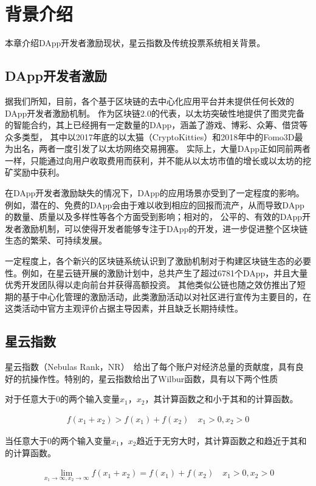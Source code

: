 \section{背景介绍}
本章介绍DApp开发者激励现状，星云指数及传统投票系统相关背景。

\subsection{DApp开发者激励}
据我们所知，目前，各个基于区块链的去中心化应用平台并未提供任何长效的DApp开发者激励机制。
作为区块链2.0的代表，以太坊突破性地提供了图灵完备的智能合约，其上已经拥有一定数量的DApp，涵盖了游戏、博彩、众筹、借贷等众多类型，
其中以2017年底的以太猫（CryptoKitties）和2018年中的Fomo3D\cite{Fomo3D}最为出名，两者一度引发了以太坊网络交易拥塞。
实际上，大量DApp正如同前两者一样，只能通过向用户收取费用而获利，并不能从以太坊市值的增长或以太坊的挖矿奖励中获利。

在DApp开发者激励缺失的情况下，DApp的应用场景亦受到了一定程度的影响。例如，潜在的、免费的DApp会由于难以收到相应的回报而流产，从而导致DApp的数量、质量以及多样性等各个方面受到影响；相对的，
公平的、有效的DApp开发者激励机制，可以使得开发者能够专注于DApp的开发，进一步促进整个区块链生态的繁荣、可持续发展。

一定程度上，各个新兴的区块链系统认识到了激励机制对于构建区块链生态的必要性。例如，在星云链开展的激励计划中，总共产生了超过6781个DApp，并且大量优秀开发团队得以走向前台并获得高额投资\cite{Nabulasincentive}。
其他类似公链也随之效仿推出了短期的基于中心化管理的激励活动，此类激励活动以对社区进行宣传为主要目的，在这类活动中官方主观评价占据主导因素，并且缺乏长期持续性。

\subsection{星云指数}
星云指数（Nebulas Rank，NR）~\cite{Nabulasyellowpaper}给出了每个账户对经济总量的贡献度，具有良好的抗操作性。特别的，星云指数给出了Wilbur函数，具有以下两个性质
\begin{property}
\label{prop:one}
对于任意大于$0$的两个输入变量$x_1$，$x_2$，其计算函数之和小于其和的计算函数。
\end{property}
\begin{align}
f(x_1+x_2)>f(x_1)+f(x_2) \quad x_1>0,x_2>0
\end{align}

\begin{property}
\label{prop:two}
当任意大于$0$的两个输入变量$x_1$，$x_2$趋近于无穷大时，其计算函数之和趋近于其和的计算函数。
\end{property}
\begin{align}
\lim\limits_{x_1 \to \infty, x_2\to \infty} f(x_1+x_2) = f(x_1) + f(x_2)\quad x_1>0, x_2>0
\end{align}

